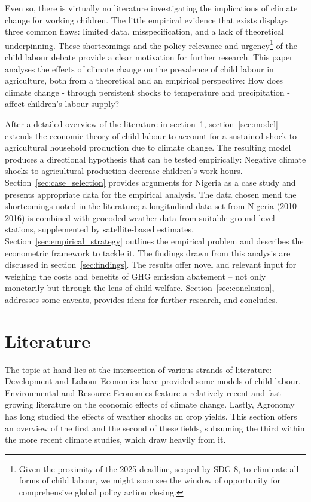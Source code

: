 \documentclass[a4paper,12pt]{article}
\theoremstyle{plain}
\theoremstyle{definition}
\theoremstyle{definition}
\theoremstyle{definition}
\theoremstyle{definition}
\begin{document}
Even so, there is virtually no literature investigating the implications of climate change for working children. The little empirical evidence that exists displays three common flaws: limited data, misspecification, and a lack of theoretical underpinning. These shortcomings and the policy-relevance and urgency\footnote{Given the proximity of the 2025 deadline, scoped by SDG 8, to eliminate all forms of child labour, we might soon see the window of opportunity for comprehensive global policy action closing.} of the child labour debate provide a clear motivation for further research. This paper analyses the effects of climate change on the prevalence of child labour in agriculture, both from a theoretical and an empirical perspective: How does climate change - through persistent shocks to temperature and precipitation - affect children's labour supply?

After a detailed overview of the literature in section~\ref{sec:literature}, section~\ref{sec:model} extends the economic theory of child labour to account for a sustained shock to agricultural household production due to climate change. The resulting model produces a directional hypothesis that can be tested empirically: Negative climate shocks to agricultural production decrease children's work hours. Section~\ref{sec:case_selection} provides arguments for Nigeria as a case study and presents appropriate data for the empirical analysis. The data chosen mend the shortcomings noted in the literature; a longitudinal data set from Nigeria (2010-2016) is combined with geocoded weather data from suitable ground level stations, supplemented by satellite-based estimates. Section~\ref{sec:empirical_strategy} outlines the empirical problem and describes the econometric framework to tackle it. The findings drawn from this analysis are discussed in section~\ref{sec:findings}. The results offer novel and relevant input for weighing the costs and benefits of GHG emission abatement – not only monetarily but through the lens of child welfare. Section~\ref{sec:conclusion}, addresses some caveats, provides ideas for further research, and concludes.

\section{Literature}
\label{sec:literature}
The topic at hand lies at the intersection of various strands of literature: Development and Labour Economics have provided some models of child labour. Environmental and Resource Economics feature a relatively recent and fast-growing literature on the economic effects of climate change. Lastly, Agronomy has long studied the effects of weather shocks on crop yields. This section offers an overview of the first and the second of these fields, subsuming the third within the more recent climate studies, which draw heavily from it.
\end{document}
